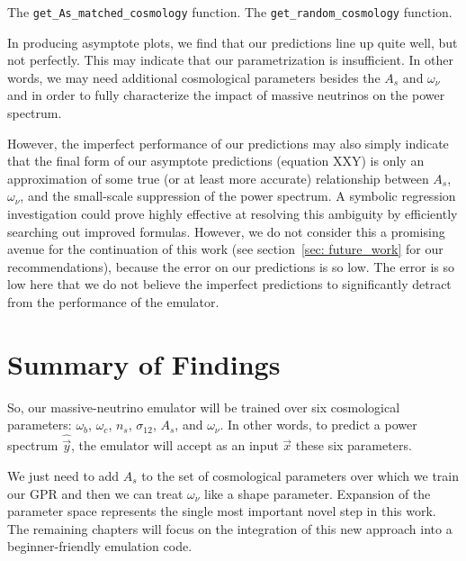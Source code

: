 The \verb|get_As_matched_cosmology| function.
The \verb|get_random_cosmology| function.

In producing asymptote plots, we find that our predictions line up quite well,
but not perfectly. This may indicate that our parametrization is insufficient.
In other words, we may need additional cosmological parameters besides the
$A_s$ and $\omega_\nu$ and in order to fully characterize the impact of
massive neutrinos on the power spectrum.

However, the imperfect performance of our predictions may also simply
indicate that the final form of our asymptote predictions (equation XXY) is
only an approximation of some true (or at least more accurate) relationship
between $A_s$, $\omega_\nu$, and the small-scale suppression of the power
spectrum. A symbolic regression investigation could prove highly effective at
resolving this ambiguity by efficiently searching out improved formulas. 
However, we do not consider this a promising avenue
for the continuation of this work (see section~\ref{sec: future_work} for our
recommendations), because the error on our predictions is so low. The error
is so low here that we do not believe the imperfect predictions to
significantly detract from the performance of the emulator.

\section{Summary of Findings}


So, our massive-neutrino emulator will be trained over six cosmological
parameters: $\omega_b$, $\omega_c$, $n_s$, $\sigma_{12}$, $A_s$, and
$\omega_\nu$. In other words, to predict a power
spectrum $\hat{\vec{y}}$, the emulator will accept as an input $\vec{x}$
these six parameters.


We just need to add $A_s$ to the set of cosmological parameters
over which we train our GPR and then we can treat $\omega_\nu$ like a shape
parameter. Expansion of the parameter space represents the single most 
important novel step in this work. The remaining chapters will
focus on the integration of this new approach into a beginner-friendly
emulation code.
